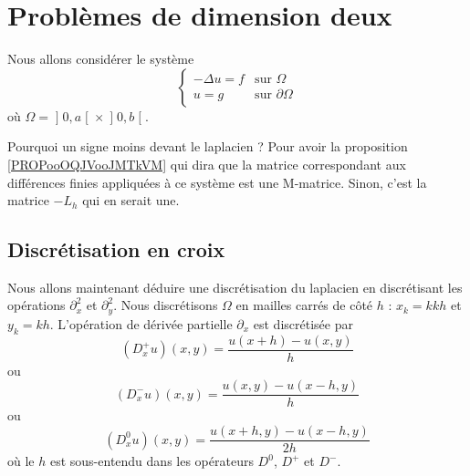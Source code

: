 \section{Problèmes de dimension deux}


Nous allons considérer le système
\begin{equation}                \label{SYSooTANLooRgnIMp}
     \begin{cases}
         -\Delta u=f    &   \text{sur } \Omega\\
         u=g            &   \text{sur } \partial\Omega
     \end{cases}
\end{equation}
où \( \Omega=\mathopen] 0 , a \mathclose[\times \mathopen] 0 , b \mathclose[\).

\begin{remark}
    Pourquoi un signe moins devant le laplacien ? Pour avoir la proposition \ref{PROPooOQJVooJMTkVM} qui dira que la matrice correspondant aux différences finies appliquées à ce système est une M-matrice. Sinon, c'est la matrice \(-L_h\) qui en serait une.
\end{remark}

\subsection{Discrétisation en croix}

Nous allons maintenant déduire une discrétisation du laplacien en discrétisant les opérations \( \partial^2_x\) et \( \partial^2_y\). Nous discrétisons \( \Omega\) en mailles carrés de côté \( h\) : \( x_k=kkh\) et \( y_k=kh\). L'opération de dérivée partielle \( \partial_x\) est discrétisée par
\begin{equation}
    (D_x^+u)(x,y)=\frac{ u(x+h)-u(x,y) }{ h }
\end{equation}
ou
\begin{equation}
    (D_x^-u)(x,y)=\frac{ u(x,y)-u(x-h,y) }{ h }
\end{equation}
ou
\begin{equation}
    (D^0_xu)(x,y)=\frac{ u(x+h,y)-u(x-h,y) }{ 2h }
\end{equation}
où le \( h\) est sous-entendu dans les opérateurs \( D^0\), \( D^+\) et \( D^-\).

